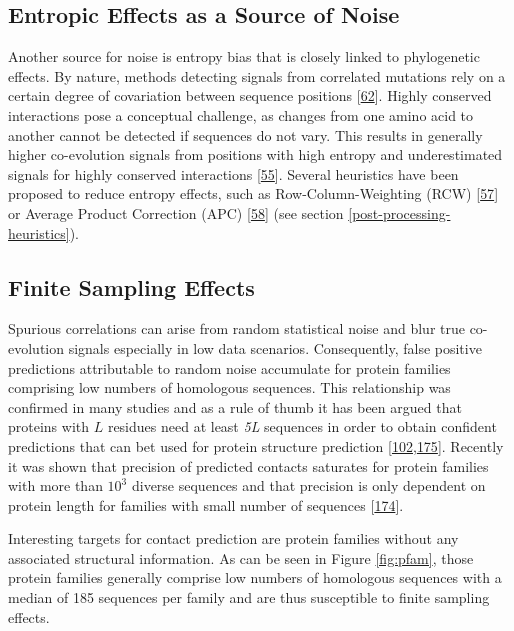 \documentclass[11pt,a4paper,twoside]{book}
\theoremstyle{definition}
\theoremstyle{definition}
\theoremstyle{remark}
\begin{document}
\subsection{Entropic Effects as a Source of
Noise}\label{entropic-effects-as-a-source-of-noise}

Another source for noise is entropy bias that is closely linked to
phylogenetic effects. By nature, methods detecting signals from
correlated mutations rely on a certain degree of covariation between
sequence positions {[}\protect\hyperlink{ref-Burger2010}{62}{]}. Highly
conserved interactions pose a conceptual challenge, as changes from one
amino acid to another cannot be detected if sequences do not vary. This
results in generally higher co-evolution signals from positions with
high entropy and underestimated signals for highly conserved
interactions {[}\protect\hyperlink{ref-Fodor2004}{55}{]}. Several
heuristics have been proposed to reduce entropy effects, such as
Row-Column-Weighting (RCW)
{[}\protect\hyperlink{ref-Gouveia_Oliveira2007}{57}{]} or Average
Product Correction (APC) {[}\protect\hyperlink{ref-Dunn2008}{58}{]} (see
section \ref{post-processing-heuristics}).

\subsection{Finite Sampling Effects}\label{finite-sampling-effects}

Spurious correlations can arise from random statistical noise and blur
true co-evolution signals especially in low data scenarios.
Consequently, false positive predictions attributable to random noise
accumulate for protein families comprising low numbers of homologous
sequences. This relationship was confirmed in many studies and as a rule
of thumb it has been argued that proteins with \(L\) residues need at
least \emph{5L} sequences in order to obtain confident predictions that
can bet used for protein structure prediction
{[}\protect\hyperlink{ref-Kamisetty2013}{102},\protect\hyperlink{ref-Marks2012}{175}{]}.
Recently it was shown that precision of predicted contacts saturates for
protein families with more than \(10^3\) diverse sequences and that
precision is only dependent on protein length for families with small
number of sequences {[}\protect\hyperlink{ref-Anishchenko2017}{174}{]}.

Interesting targets for contact prediction are protein families without
any associated structural information. As can be seen in Figure
\ref{fig:pfam}, those protein families generally comprise low numbers of
homologous sequences with a median of 185 sequences per family and are
thus susceptible to finite sampling effects.
\end{document}
